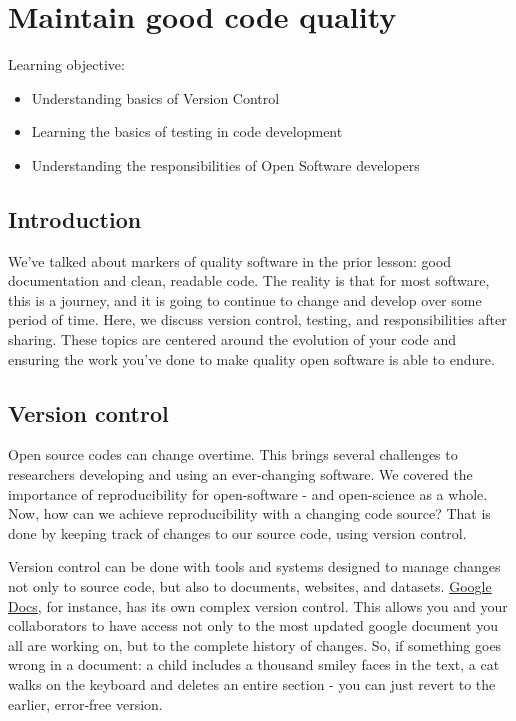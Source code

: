 \documentclass[
  letterpaper,
  DIV=11,
  numbers=noendperiod]{scrreport}
\providecommand{\tightlist}{%
  \setlength{\itemsep}{0pt}\setlength{\parskip}{0pt}}\usepackage{longtable,booktabs,array}
\begin{document}
\hypertarget{maintain-good-code-quality}{%
\chapter{Maintain good code quality}\label{maintain-good-code-quality}}

Learning objective:

\begin{itemize}
\tightlist
\item
  Understanding basics of Version Control
\item
  Learning the basics of testing in code development
\item
  Understanding the responsibilities of Open Software developers
\end{itemize}

\hypertarget{introduction-8}{%
\section{Introduction}\label{introduction-8}}

We've talked about markers of quality software in the prior lesson: good
documentation and clean, readable code. The reality is that for most
software, this is a journey, and it is going to continue to change and
develop over some period of time. Here, we discuss version control,
testing, and responsibilities after sharing. These topics are centered
around the evolution of your code and ensuring the work you've done to
make quality open software is able to endure.

\hypertarget{version-control}{%
\section{Version control}\label{version-control}}

Open source codes can change overtime. This brings several challenges to
researchers developing and using an ever-changing software. We covered
the importance of reproducibility for open-software - and open-science
as a whole. Now, how can we achieve reproducibility with a changing code
source? That is done by keeping track of changes to our source code,
using version control.

Version control can be done with tools and systems designed to manage
changes not only to source code, but also to documents, websites, and
datasets. \href{docs.google.com}{Google Docs}, for instance, has its own
complex version control. This allows you and your collaborators to have
access not only to the most updated google document you all are working
on, but to the complete history of changes. So, if something goes wrong
in a document: a child includes a thousand smiley faces in the text, a
cat walks on the keyboard and deletes an entire section - you can just
revert to the earlier, error-free version.
\end{document}
